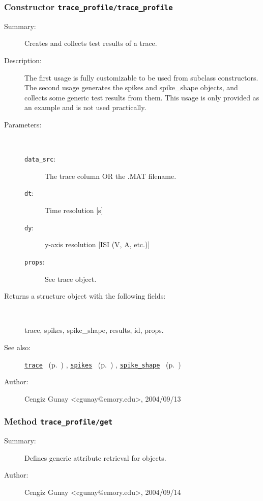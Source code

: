 \subsubsection[Constructor \texttt{trace\_profile}]{Constructor \texttt{trace\_profile/trace\_profile}}%
%
\label{ref_trace_profile__trace_profile}%
\hypertarget{ref_trace_profile__trace_profile}{}%
\begin{description}
\item[Summary:]Creates and collects test results of a trace.
%
%
\item[Description:]%
The first usage is fully customizable to be used from subclass constructors.
 The second usage generates the spikes and spike\_shape objects, and
 collects some generic test results from them. This usage is only provided
 as an example and is not used practically.
\item[Parameters:]~
\begin{description}%
\item[\texttt{data\_src}:]
 The trace column OR the .MAT filename.
\item[\texttt{dt}:]
 Time resolution [s]
\item[\texttt{dy}:]
 y-axis resolution [ISI (V, A, etc.)]
\item[\texttt{props}:]
 See trace object.
\end{description}%
%
\item[Returns a structure object with the following fields:
]~

	trace, spikes, spike\_shape, results, id, props.
%
%
\item[See also:]%
\hyperlink{ref_trace}{\texttt{trace}}%
\ (p.~\pageref{ref_trace})%
%
, \hyperlink{ref_spikes}{\texttt{spikes}}%
\ (p.~\pageref{ref_spikes})%
%
, \hyperlink{ref_spike_shape}{\texttt{spike\_shape}}%
\ (p.~\pageref{ref_spike_shape})%
%
%
\item[Author:]%
Cengiz Gunay <cgunay@emory.edu>, 2004/09/13
%
\end{description}
\methodline%
\subsubsection[Method \texttt{get}]{Method \texttt{trace\_profile/get}}%
%
\label{ref_trace_profile__get}%
\hypertarget{ref_trace_profile__get}{}%
\begin{description}
\item[Summary:]Defines generic attribute retrieval for objects.
%
%
%
%
%
%
%
\item[Author:]%
Cengiz Gunay <cgunay@emory.edu>, 2004/09/14
%
\end{description}
\methodline%
